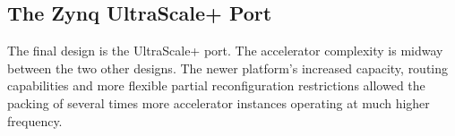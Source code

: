 \subsection{The Zynq UltraScale+ Port}

The final design is the UltraScale+ port.
The accelerator complexity is midway between the two other designs. 
The newer platform's increased capacity, routing capabilities 
and more flexible partial reconfiguration restrictions
allowed the packing of several times more accelerator instances
operating at much higher frequency.






